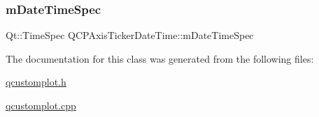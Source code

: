 \subsubsection{\texorpdfstring{m\+Date\+Time\+Spec}{mDateTimeSpec}}
{\footnotesize\ttfamily Qt\+::\+Time\+Spec Q\+C\+P\+Axis\+Ticker\+Date\+Time\+::m\+Date\+Time\+Spec\hspace{0.3cm}{\ttfamily [protected]}}



The documentation for this class was generated from the following files\+:\begin{DoxyCompactItemize}
\item 
\hyperlink{qcustomplot_8h}{qcustomplot.\+h}\item 
\hyperlink{qcustomplot_8cpp}{qcustomplot.\+cpp}\end{DoxyCompactItemize}
